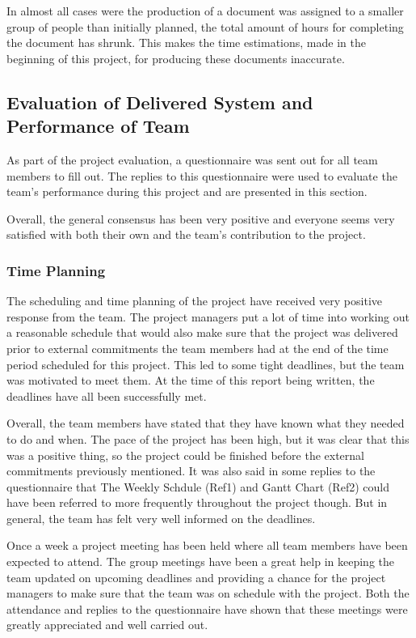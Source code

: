 \documentclass[a4paper]{article}
\begin{document}
In almost all cases were the production of a document was assigned to a smaller group of people than initially planned, the total amount of hours for completing the document has shrunk. This makes the time estimations, made in the beginning of this project, for producing these documents inaccurate. 




\subsection{Evaluation of Delivered System and Performance of Team}
\label{sec:teval}
As part of the project evaluation, a questionnaire was sent out for all team members to fill out. The replies to this questionnaire were used to evaluate the team's performance during this project and are presented in this section. 

Overall, the general consensus has been very positive and everyone seems very satisfied with both their own and the team's contribution to the project.



\subsubsection{Time Planning}
The scheduling and time planning of the project have received very positive response from the team. The project managers put a lot of time into working out a reasonable schedule that would also make sure that the project was delivered prior to external commitments the team members had at the end of the time period scheduled for this project. This led to some tight deadlines, but the team was motivated to meet them. At the time of this report being written, the deadlines have all been successfully met. 

Overall, the team members have stated that they have known what they needed to do and when. The pace of the project has been high, but it was clear that this was a positive thing, so the project could be finished before the external commitments previously mentioned. It was also said in some replies to the questionnaire that The Weekly Schdule (Ref1) and Gantt Chart (Ref2) could have been referred to more frequently throughout the project though. But in general, the team has felt very well informed on the deadlines.

Once a week a project meeting has been held where all team members have been expected to attend. The group meetings have been a great help in keeping the team updated on upcoming deadlines and providing a chance for the project managers to make sure that the team was on schedule with the project. Both the attendance and replies to the questionnaire have shown that these meetings were greatly appreciated and well carried out.
\end{document}
